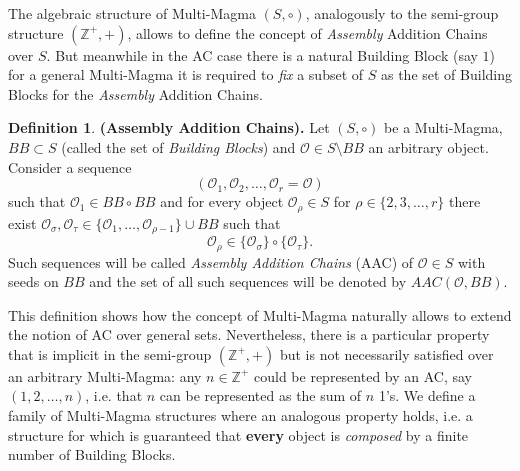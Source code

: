 \documentclass[letterpaper,12pt]{article}
\theoremstyle{definition}
\newtheorem{definition}{Definition}
\begin{document}
The algebraic structure of Multi-Magma $(S,\circ)$, analogously to the semi-group structure $(\mathbb{Z}^+,+)$, allows to define the concept of \textit{Assembly} Addition Chains over $S$. But meanwhile in the AC case there is a natural Building Block (say $1$) for a general Multi-Magma it is required to \textit{fix} a subset of $S$ as the set of Building Blocks for the \textit{Assembly} Addition Chains. 

\begin{definition}\label{AAC} \textbf{(Assembly Addition Chains).}
Let $(S,\circ)$ be a Multi-Magma, $BB \subset S$ (called the set of \textit{Building Blocks}) and $\mathscr{O} \in S \setminus BB$ an arbitrary object. Consider a sequence
\begin{equation*}
    (\mathscr{O}_1,\mathscr{O}_2,\dots, \mathscr{O}_r=\mathscr{O})
\end{equation*}
such that $\mathscr{O}_1 \in BB \circ BB$ and for every object $\mathscr{O}_\rho \in S$ for $\rho \in \{2,3,\dots,r\}$ there exist  $\mathscr{O}_\sigma,\mathscr{O}_\tau \in \{\mathscr{O}_1,\dots, \mathscr{O}_{\rho-1}\} \cup BB$ such that 
\begin{equation}
    \mathscr{O}_\rho \in \{\mathscr{O}_\sigma\} \circ \{\mathscr{O}_\tau\}.
\end{equation}
Such sequences will be called \textit{Assembly Addition Chains} (AAC) of $\mathscr{O} \in S$ with seeds on $BB$ and the set of all such sequences will be denoted by $AAC(\mathscr{O},BB)$. 
\end{definition}

This definition shows how the concept of Multi-Magma naturally allows to extend the notion of AC over general sets. Nevertheless, there is a particular property that is implicit in the semi-group $(\mathbb{Z}^+,+)$ but is not necessarily satisfied over an arbitrary Multi-Magma: any $n \in \mathbb{Z}^+$ could be represented by  an AC, say $(1,2,\dots,n)$, i.e. that $n$ can be represented as the sum of $n$ 1's. We define a family of Multi-Magma structures where an analogous property holds, i.e. a structure for which is guaranteed that \textbf{every} object is \textit{composed} by a finite number of Building Blocks. 
\end{document}
